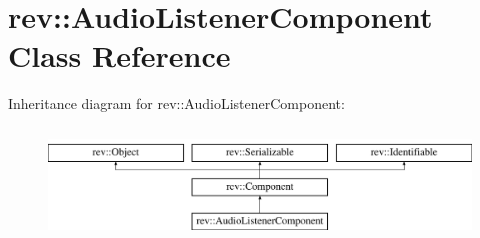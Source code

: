 \hypertarget{classrev_1_1_audio_listener_component}{}\section{rev\+::Audio\+Listener\+Component Class Reference}
\label{classrev_1_1_audio_listener_component}
Inheritance diagram for rev\+::Audio\+Listener\+Component\+:\begin{figure}[H]
\begin{center}
\leavevmode
\includegraphics[height=3.000000cm]{classrev_1_1_audio_listener_component}
\end{center}
\end{figure}

